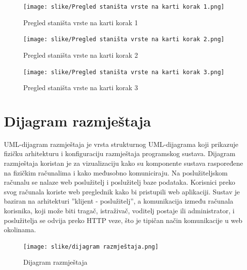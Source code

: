 			\begin{figure}[H]
				\texttt{[image: slike/Pregled staništa vrste na karti korak 1.png]}
				\centering
				\caption{Pregled staništa vrste na karti korak 1}
				\label{fig:Pregled staništa vrste na karti korak 1}
			\end{figure}

			\begin{figure}[H]
				\texttt{[image: slike/Pregled staništa vrste na karti korak 2.png]}
				\centering
				\caption{Pregled staništa vrste na karti korak 2}
				\label{fig:Pregled staništa vrste na karti korak 2}
			\end{figure}

			\begin{figure}[H]
				\texttt{[image: slike/Pregled staništa vrste na karti korak 3.png]}
				\centering
				\caption{Pregled staništa vrste na karti korak 3}
				\label{fig:Pregled staništa vrste na karti korak 3}
			\end{figure}




		\section{Dijagram razmještaja}

		UML-dijagram razmještaja je vrsta strukturnog UML-dijagrama 
		koji prikazuje fizičku arhitekturu i konfiguraciju 
		razmještaja programskog sustava. Dijagram razmještaja koristan je 
		za vizualizaciju kako su komponente sustava raspoređene na fizičkim 
		računalima i kako međusobno komuniciraju.
		Na poslužiteljskom računalu se 
		nalaze web poslužitelj i poslužitelj baze podataka. Korisnici preko svog računala koriste web
		preglednik kako bi pristupili web aplikaciji. Sustav je baziran na arhitekturi 
		”klijent - poslužitelj”, a komunikacija između računala korisnika, 
		koji može biti tragač, istraživač, voditelj postaje ili administrator, i poslužitelja se 
		odvija preko HTTP veze, što je tipičan način komunikacije u web okolinama.

		\begin{figure}[H]
			\texttt{[image: slike/dijagram razmještaja.png]}
			\centering
			\caption{Dijagram razmještaja}
			\label{fig:dijagram razmještaja}
		\end{figure}
			\eject 

